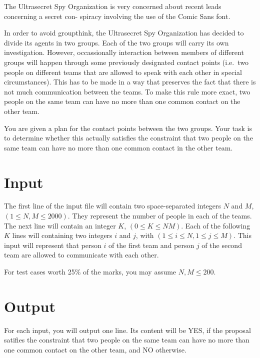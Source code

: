 The Ultrasecret Spy Organization is very concerned about recent leads concerning a secret con-
spiracy involving the use of the Comic Sans font.

In order to avoid groupthink, the Ultrasecret Spy Organization has decided to divide its agents in
two groups. Each of the two groups will carry its own investigation. However, occassionally
interaction between members of different groups will happen through some previously designated
contact points (i.e.\ two people on different teams that are allowed to speak with each other in
special circumstances). This has to be made in a way that preserves the fact that there is not much
communication between the teams. To make this rule more exact, two people on the same team can have
no more than one common contact on the other team.

You are given a plan for the contact points between the two groups. Your task is to determine
whether this actually satisfies the constraint that two people on the same team can have no more
than one common contact in the other team.

\section*{Input}
The first line of the input file will contain two space-separated integers $N$ and $M$, $(1 \le N, M
\le 2000)$. They represent the number of people in each of the teams. The next line will contain an
integer $K$, $(0 \le K \le NM)$. Each of the following $K$ lines will containing two integers $i$
and $j$, with $(1 \le i \le N, 1 \le j \le M)$. This input will represent that person $i$ of the
first team and person $j$ of the second team are allowed to communicate with each other.

For test cases worth 25\% of the marks, you may assume $N, M \le 200$.

\section*{Output}
For each input, you will output one line. Its content will be YES, if the proposal satifies the
constraint that two people on the same team can have no more than one common contact on the
other team, and NO otherwise.
